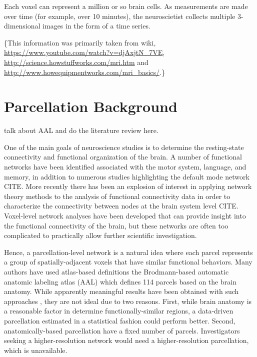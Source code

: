 {Each voxel can represent a million or so brain cells. As measurements
are made over time (for example, over 10 minutes), the neuroscietist
collects multiple 3-dimensional images in the form of a time series. 

\{This information was primarily taken from wiki,
\url{https://www.youtube.com/watch?v=djAxjtN\_7VE},
\url{http://science.howstuffworks.com/mri.htm} and
\url{http://www.howequipmentworks.com/mri\_basics/}.\}
}

\section{Parcellation Background}

{\color{red} talk about AAL and do the literature review here.}

{\color{blue}
One of the main goals of neuroscience studies is to determine
the resting-state connectivity and functional organization of the brain.
A
number of functional networks have been identified associated with
the motor system, language, and memory, in addition to numerous
studies highlighting the default mode network CITE.
More recently there has been an explosion of interest in applying
network theory methods to the analysis of functional connectivity
data in order to characterize the connectivity between nodes at the
brain system level CITE.
Voxel-level network analyses have been developed
that can provide insight into the functional connectivity
of the brain, but these networks are often too complicated to practically
allow further scientific investigation.

Hence, a parcellation-level network is a natural idea where
each parcel represents a group of spatially-adjacent voxels that
have similar functional behaviors. 
Many authors have used atlas-based definitions the Brodmann-based
automatic anatomic labeling atlas (AAL) \cite{tzourio2002automated} which defines 114 parcels based on the brain
anatomy.
While apparently meaningful results have
been obtained with such approaches \cite{hartman2011role, he2009uncovering, liu2008disrupted, lynall2010functional, power2011functional, salvador2005neurophysiological, spoormaker2010development, supekar2008network, tian2011hemisphere, wang2009parcellation}, they are not ideal due to two reasons.
First, while brain anatomy is a reasonable factor in determine functionally-similar
regions, a data-driven parcellation estimated in a statistical fashion
could perform better. Second, anatomically-based parcellation have a fixed
number of parcels. Investigators seeking a higher-resolution network would
need a higher-resolution parcellation, which is unavailable.

}
